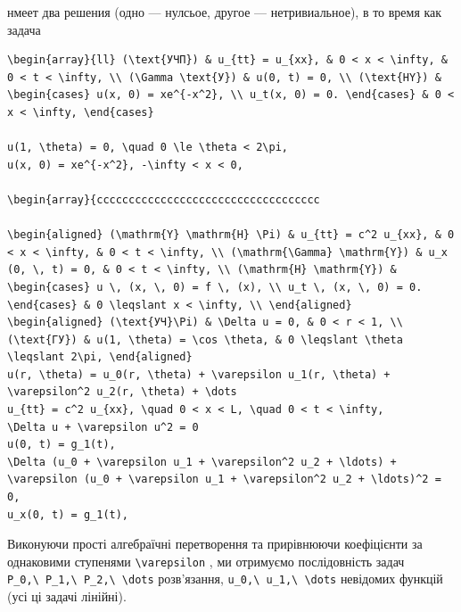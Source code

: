 \documentclass[
  ukrainian,
]{article}
\begin{document}
нмеет два решения (одно --- нулсьое, другое --- нетривиальное), в то
время как задача

\begin{verbatim}
\begin{array}{ll} (\text{УЧП}) & u_{tt} = u_{xx}, & 0 < x < \infty, & 0 < t < \infty, \\ (\Gamma \text{У}) & u(0, t) = 0, \\ (\text{HY}) & \begin{cases} u(x, 0) = xe^{-x^2}, \\ u_t(x, 0) = 0. \end{cases} & 0 < x < \infty, \end{cases}

u(1, \theta) = 0, \quad 0 \le \theta < 2\pi,
u(x, 0) = xe^{-x^2}, -\infty < x < 0,

\begin{array}{ccccccccccccccccccccccccccccccccccc

\begin{aligned} (\mathrm{Y} \mathrm{H} \Pi) & u_{tt} = c^2 u_{xx}, & 0 < x < \infty, & 0 < t < \infty, \\ (\mathrm{\Gamma} \mathrm{Y}) & u_x (0, \, t) = 0, & 0 < t < \infty, \\ (\mathrm{H} \mathrm{Y}) & \begin{cases} u \, (x, \, 0) = f \, (x), \\ u_t \, (x, \, 0) = 0. \end{cases} & 0 \leqslant x < \infty, \\ \end{aligned}
\begin{aligned} (\text{УЧ}\Pi) & \Delta u = 0, & 0 < r < 1, \\ (\text{ГУ}) & u(1, \theta) = \cos \theta, & 0 \leqslant \theta \leqslant 2\pi, \end{aligned}
u(r, \theta) = u_0(r, \theta) + \varepsilon u_1(r, \theta) + \varepsilon^2 u_2(r, \theta) + \dots
u_{tt} = c^2 u_{xx}, \quad 0 < x < L, \quad 0 < t < \infty,
\Delta u + \varepsilon u^2 = 0
u(0, t) = g_1(t),
\Delta (u_0 + \varepsilon u_1 + \varepsilon^2 u_2 + \ldots) + \varepsilon (u_0 + \varepsilon u_1 + \varepsilon^2 u_2 + \ldots)^2 = 0,
u_x(0, t) = g_1(t),
\end{verbatim}

Виконуючи прості алгебраїчні перетворення та прирівнюючи коефіцієнти за
однаковими ступенями \texttt{\textbackslash{}varepsilon} , ми отримуємо
послідовність задач
\texttt{P\_0,\textbackslash{}\ P\_1,\textbackslash{}\ P\_2,\textbackslash{}\ \textbackslash{}dots}
розв'язання,
\texttt{u\_0,\textbackslash{}\ u\_1,\textbackslash{}\ \textbackslash{}dots}
невідомих функцій (усі ці задачі лінійні).
\end{document}
